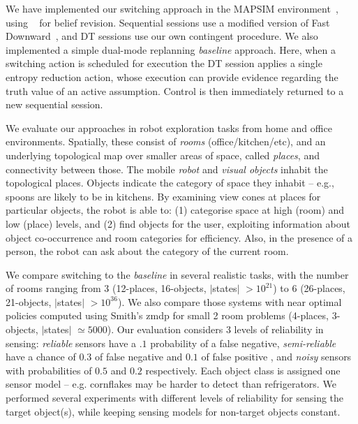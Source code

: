 
We have implemented our switching approach in the MAPSIM
environment~\cite{brenner:nebel:jaamas09},
using ~\cite{king:2009} for belief
revision. Sequential sessions use a modified version of Fast
Downward~\cite{fast-downward}, and DT sessions use our own contingent
procedure. We also implemented a simple dual-mode replanning {\em
baseline} approach. Here, when a switching action is scheduled for
execution the DT session applies a single entropy reduction action,
whose execution can provide evidence regarding the truth value of an
active assumption.
Control is then immediately
returned to a new sequential session.


We evaluate our approaches in robot exploration tasks from home and
office environments. Spatially, these consist of {\em rooms}
(office/kitchen/etc), and an underlying topological map over
smaller areas of space, called {\em places}, and connectivity between
those. The mobile {\em robot} and {\em visual objects} inhabit the
topological places. Objects indicate the category of space they
inhabit -- e.g., spoons are likely to be in kitchens. By examining
view cones at places for particular objects, the robot is able to: (1)
categorise space at high (room) and low (place) levels, and (2) find
objects for the user, exploiting information about object
co-occurrence and room categories for efficiency. Also, in the
presence of a person, the robot can ask about the category of the
current room.


We compare switching to the {\em baseline} in several realistic
tasks, with the number of rooms ranging from 3 (12-places, 16-objects,
$|$states$|$ $>10^{21}$) to 6 (26-places, 21-objects, $|$states$|$
$>10^{36}$). We also compare those systems with near optimal policies
computed using Smith's {\sc zmdp} for small 2 room problems (4-places,
3-objects, $|$states$|$ $\simeq 5000$). Our evaluation considers 3
levels of reliability in sensing: {\em reliable} sensors have a $.1$
probability of a false negative, {\em semi-reliable} have a chance of
$0.3$ of false negative and $0.1$ of false positive , and {\em noisy}
sensors with probabilities of $0.5$ and $0.2$ respectively. Each
object class is assigned one sensor model -- e.g. cornflakes may be
harder to detect than refrigerators. We performed several experiments
with different levels of reliability for sensing the target object(s),
while keeping sensing models for non-target objects constant.

